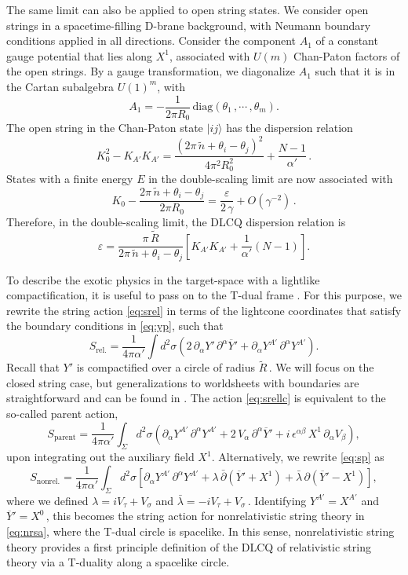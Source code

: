 \documentclass[11pt]{article}
\newcommand{\be}{\begin{equation}}
\newcommand{\ee}{\end{equation}}
\newcommand{\lr}{\left (}
\newcommand{\rr}{\right )}
\newcommand{\p}{\partial}
\renewcommand{\tilde}[1]{\widetilde{#1}}
\begin{document}
The same limit can also be applied to open string states. We consider open strings in a spacetime-filling D-brane background, with Neumann boundary conditions applied in all directions. Consider the component $A_1$ of a constant gauge potential that lies along $X^1$, associated with $U(m)$ Chan-Paton factors of the open strings. By a gauge transformation, we diagonalize $A_1$ such that it is in the Cartan subalgebra $U(1)^m$, with
%
\be
    A_1 = - \frac{1}{2\pi R_0} \, \text{diag} \left( \theta_1\,, \cdots\,, \theta_m \right).
\ee
%
The open string in the Chan-Paton state $|ij\rangle$ has the dispersion relation
%
\be
    K_0^2 - K_{A'} K_{A'} = \frac{\left( 2 \pi \, \tilde{n} + \theta_i - \theta_j \right)^2}{4 \pi^2 R_0^2} + \frac{N - 1}{\alpha'}\,.
\ee
%
States with a finite energy $E$ in the double-scaling limit are now associated with
%
\be \label{eq:ce}
    K_0 - \frac{2 \pi \, \tilde{n} + \theta_i - \theta_j}{2 \pi R_0} = \frac{\varepsilon}{2 \, \gamma} + O(\gamma^{-2})\,.
\ee
%
Therefore, in the double-scaling limit, the DLCQ dispersion relation is
%
\be \label{eq:dlcqdros}
    \varepsilon = \frac{\pi \, \tilde{R}}{2 \pi \, \tilde{n} + \theta_i - \theta_j} \left[ K_{A'} K_{A'} + \frac{1}{\alpha'} \left( N - 1 \right) \right].
\ee

To describe the exotic physics in the target-space with a lightlike compactification, it is useful to pass on to the T-dual frame \cite{Bergshoeff:2018yvt}. For this purpose, we rewrite the string action \eqref{eq:srel} in terms of the lightcone coordinates that satisfy the boundary conditions in \eqref{eq:yp}, such that
%
\be \label{eq:srellc}
    S_\text{rel.} = \frac{1}{4\pi\alpha'} \int d^2 \sigma \left( 2 \, \p_\alpha Y' \, \p^\alpha \overline{Y}{}' + \p_\alpha Y^{A'} \, \p^\alpha Y^{A'} \right). 
\ee
%
Recall that $Y'$ is compactified over a circle of radius $\tilde{R}$\,. We will focus on the closed string case, but generalizations to worldsheets with boundaries are straightforward and can be found in \cite{Gomis:2020fui}. The action \eqref{eq:srellc} is equivalent to the so-called parent action,
%
\be \label{eq:sp}
    S_\text{parent} = \frac{1}{4\pi\alpha'} \int_\Sigma d^2 \sigma \left( \p_\alpha Y^{A'} \, \p^\alpha Y^{A'} + 2 \, V_\alpha \, \p^\alpha \overline{Y}{}' + i \, \epsilon^{\alpha\beta} \, X^1 \, \p_\alpha V_\beta \right),
\ee
%
upon integrating out the auxiliary field $X^1$. Alternatively, we rewrite \eqref{eq:sp} as
%
\be
    S_\text{nonrel.} = \frac{1}{4\pi\alpha'} \int_\Sigma d^2 \sigma \left[ \p_\alpha Y^{A'} \, \p^\alpha Y^{A'} + \lambda \, \bar{\p} \lr \overline{Y}{}' + X^1 \rr + \bar{\lambda} \, \p \lr \overline{Y}{}' - X^1 \rr \right],
\ee
%
where we defined $\lambda = i V_\tau + V_\sigma$ and $\bar{\lambda} = - i V_\tau + V_\sigma$\,. Identifying $Y^{A'} = X^{A'}$ and $\overline{Y}{}' = X^0$\,, this becomes the string action for nonrelativistic string theory in \eqref{eq:nrsa}, where the T-dual circle is spacelike. In this sense, nonrelativistic string theory provides a first principle definition of the DLCQ of relativistic string theory via a T-duality along a spacelike circle. 
\end{document}
